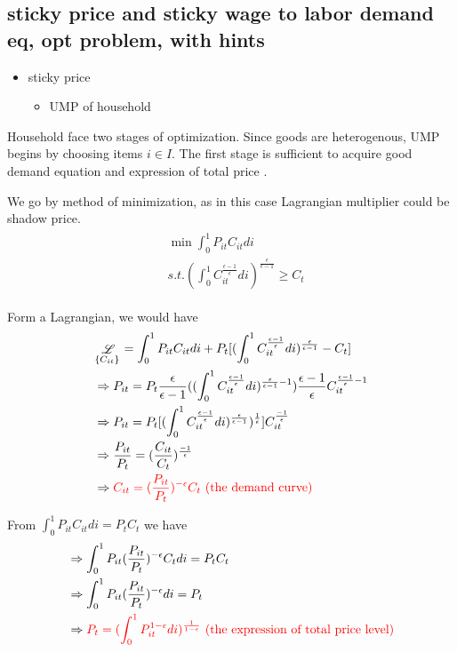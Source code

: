 \documentclass{article}
\begin{document}
\newpage
\subsection{sticky price and sticky wage to labor demand eq, opt problem, with hints}


\begin{itemize}
  \item sticky price
  \begin{itemize}
    \item UMP of household
  \end{itemize}
\end{itemize}

Household face two stages of optimization. Since goods are heterogenous, UMP begins by choosing items $i\in I$. The first stage is sufficient to acquire good demand equation and expression of total price .

We go by method of minimization, as in this case Lagrangian multiplier could be shadow price.
\begin{align}
\begin{split}
& \min \int_{0}^{1} P_{it}C_{it}di
\\& s.t. (\int_{0}^{1}C_{it}^{\frac{\epsilon-1}{\epsilon}}di)^{\frac{\epsilon}{\epsilon-1}} \geqslant C_{t}
\end{split}
\end{align}

Form a Lagrangian, we would have
\begin{align}
&\mathop{\mathscr{L}}\limits_{\{C_{it}\}} =\int_{0}^{1} P_{it}C_{it}di+P_{t}[(\int_{0}^{1}C_{it}^{\frac{\epsilon-1}{\epsilon}}di)^{\frac{\epsilon}{\epsilon-1}}-C_{t}]
\\&\Rightarrow P_{it}=P_{t}\frac{\epsilon}{\epsilon-1}((\int_{0}^{1}C_{it}^{\frac{\epsilon-1}{\epsilon}}di)^{\frac{\epsilon}{\epsilon-1}-1})\frac{\epsilon-1}{\epsilon} C_{it}^{\frac{\epsilon-1}{\epsilon}-1}
\\&\Rightarrow P_{it}=P_{t}[(\int_{0}^{1}C_{it}^{\frac{\epsilon-1}{\epsilon}}di)^{\frac{\epsilon}{\epsilon-1}})^{\frac{1}{\epsilon}}]C_{it}^{\frac{-1}{\epsilon}}
\\&\Rightarrow \frac{P_{it}}{P_{t}}=(\frac{C_{it}}{C_{t}})^{\frac{-1}{\epsilon}}
\\&\Rightarrow \color{red} C_{it}=(\frac{P_{it}}{P_{t}})^{-\epsilon}C_{t} \text{ (the demand curve)}
\end{align}

From $\int_{0}^{1} P_{it}C_{it}di =P_{t}C_{t}$ we have
\begin{align}
&\Rightarrow \int_{0}^{1} P_{it}(\frac{P_{it}}{P_{t}})^{-\epsilon}C_{t} di=P_{t}C_{t}
\\&\Rightarrow \int_{0}^{1} P_{it}(\frac{P_{it}}{P_{t}})^{-\epsilon} di=P_{t}
\\&\Rightarrow \color{red} P_{t}=(\int_{0}^{1}P_{it}^{1-\epsilon}di)^{\frac{1}{1-\epsilon}} \text{ (the expression of total price level)}
\end{align}
\end{document}

